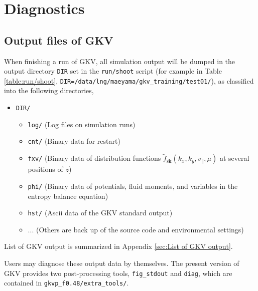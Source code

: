 \chapter{Diagnostics}
\label{chap:Diagnostics}

\section{Output files of GKV}
\label{sec:Output files of GKV}

When finishing a run of GKV, all simulation output will be dumped in the output directory \texttt{DIR} set in the \texttt{run/shoot} script (for example in Table \ref{table:run/shoot}, \texttt{DIR=/data/lng/maeyama/gkv\_training/test01/}), as classified into the following directories,
\begin{itemize}
  \item \texttt{DIR/}
  \begin{itemize}
    \item \texttt{log/} (Log files on simulation runs)
    \item \texttt{cnt/} (Binary data for restart)
    \item \texttt{fxv/} (Binary data of distribution functions $\tilde{f}_{\mathrm{s}\bm{k}}(k_x,k_y,v_\parallel,\mu)$ at several positions of $z$)
    \item \texttt{phi/} (Binary data of potentials, fluid moments, and variables in the entropy balance equation)%
    \item \texttt{hst/} (Ascii data of the GKV standard output)
    \item ... (Others are back up of the source code and environmental settings)
  \end{itemize}
\end{itemize}
List of GKV output is summarized in Appendix \ref{sec:List of GKV output}.

Users may diagnose these output data by themselves. The present version of GKV provides two post-processing tools, \texttt{fig\_stdout} and \texttt{diag}, which are contained in \texttt{gkvp\_f0.48/extra\_tools/}.




